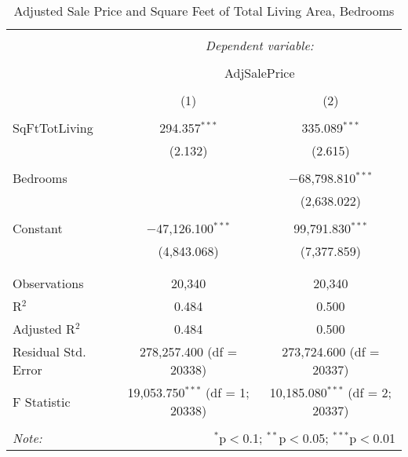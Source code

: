 \documentclass[12pt,letterpaper]{article}
\begin{document}
\begin{table}[!htbp] \centering 
	\caption{Adjusted Sale Price and Square Feet of Total Living Area, Bedrooms} 
	\label{} 
	\begin{tabular}{@{\extracolsep{5pt}}lcc} 
		\\[-1.8ex]\hline 
		\hline \\[-1.8ex] 
		& \multicolumn{2}{c}{\textit{Dependent variable:}} \\ 
		\cline{2-3} 
		\\[-1.8ex] & \multicolumn{2}{c}{AdjSalePrice} \\ 
		\\[-1.8ex] & (1) & (2)\\ 
		\hline \\[-1.8ex] 
		SqFtTotLiving & 294.357$^{***}$ & 335.089$^{***}$ \\ 
		& (2.132) & (2.615) \\ 
		& & \\ 
		Bedrooms &  & $-$68,798.810$^{***}$ \\ 
		&  & (2,638.022) \\ 
		& & \\ 
		Constant & $-$47,126.100$^{***}$ & 99,791.830$^{***}$ \\ 
		& (4,843.068) & (7,377.859) \\ 
		& & \\ 
		\hline \\[-1.8ex] 
		Observations & 20,340 & 20,340 \\ 
		R$^{2}$ & 0.484 & 0.500 \\ 
		Adjusted R$^{2}$ & 0.484 & 0.500 \\ 
		Residual Std. Error & 278,257.400 (df = 20338) & 273,724.600 (df = 20337) \\ 
		F Statistic & 19,053.750$^{***}$ (df = 1; 20338) & 10,185.080$^{***}$ (df = 2; 20337) \\ 
		\hline 
		\hline \\[-1.8ex] 
		\textit{Note:}  & \multicolumn{2}{r}{$^{*}$p$<$0.1; $^{**}$p$<$0.05; $^{***}$p$<$0.01} \\ 
	\end{tabular} 
\end{table} 
\end{document}
